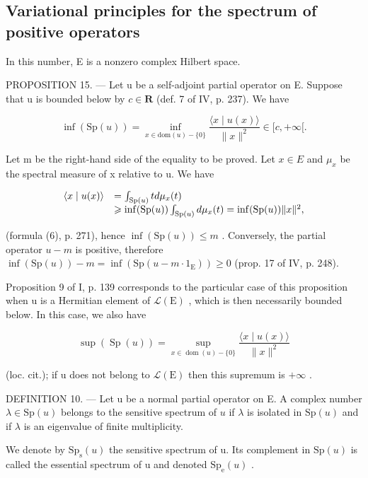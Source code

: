 \subsection{Variational principles for the spectrum of positive operators}

In this number, E is a nonzero complex Hilbert space.

PROPOSITION 15. --- Let u be a self-adjoint partial operator on E. Suppose that u is bounded below by \(c \in \mathbf{R}\) (def. 7 of IV, p. 237). We have

\[
\inf (\mathrm{Sp} (u)) = \inf _ {x \in \mathrm{dom} (u) - \{0 \}} \frac {\langle x \mid u (x) \rangle}{\| x \| ^ {2}} \in [ c, + \infty [.
\]

Let m be the right-hand side of the equality to be proved. Let \(x \in E\) and \(\mu_{x}\) be the spectral measure of x relative to u. We have

\[
\begin{array}{r l} \langle x \mid u (x) \rangle & = \int_ {\mathrm{Sp} (u)} t d \mu_ {x} (t) \\ & \geqslant \inf (\mathrm{Sp} (u)) \int_ {\mathrm{Sp} (u)} d \mu_ {x} (t) = \inf (\mathrm{Sp} (u)) \| x \| ^ {2}, \end{array}
\]

(formula (6), p. 271), hence \(\inf(\mathrm{Sp}(u)) \leqslant m\) . Conversely, the partial operator \(u - m\) is positive, therefore \(\inf(\mathrm{Sp}(u)) - m = \inf(\mathrm{Sp}(u - m \cdot 1_{\mathrm{E}})) \geqslant 0\) (prop. 17 of IV, p. 248).

Proposition 9 of I, p. 139 corresponds to the particular case of this proposition when u is a Hermitian element of \(\mathcal{L}(\mathrm{E})\) , which is then necessarily bounded below. In this case, we also have

\[
\sup (\operatorname{Sp} (u)) = \sup _ {x \in \operatorname{dom} (u) - \{0 \}} \frac {\langle x \mid u (x) \rangle}{\| x \| ^ {2}}
\]

(loc. cit.); if u does not belong to \(\mathcal{L}(\mathrm{E})\) then this supremum is \(+\infty\) .

DEFINITION 10. --- Let u be a normal partial operator on E. A complex number \(\lambda \in \mathrm{Sp}(u)\) belongs to the sensitive spectrum of \(u\) if \(\lambda\) is isolated in \(\mathrm{Sp}(u)\) and if \(\lambda\) is an eigenvalue of finite multiplicity.

We denote by \(\mathrm{Sp}_{\mathrm{s}}(u)\) the sensitive spectrum of u. Its complement in \(\mathrm{Sp}(u)\) is called the essential spectrum of u and denoted \(\mathrm{Sp}_{\mathrm{e}}(u)\) .

